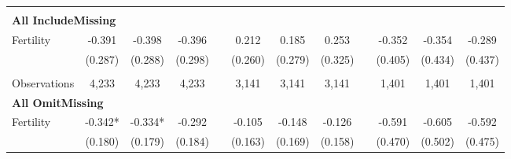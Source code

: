 \begin{landscape}
\begin{table}[htpb!]
\begin{center}
\begin{tabular}{lcccp{2mm}cccp{2mm}ccc}
\begin{footnotesize}\end{footnotesize}\\ 
\multicolumn{12}{l}{\textbf{All IncludeMissing}}\\ 
Fertility&-0.391&-0.398&-0.396&&0.212&0.185&0.253&&-0.352&-0.354&-0.289\\
&(0.287)&(0.288)&(0.298)&&(0.260)&(0.279)&(0.325)&&(0.405)&(0.434)&(0.437)\\
\begin{footnotesize}\end{footnotesize}&\begin{footnotesize}\end{footnotesize}&\begin{footnotesize}\end{footnotesize}&\begin{footnotesize}\end{footnotesize}&\begin{footnotesize}\end{footnotesize}&\begin{footnotesize}\end{footnotesize}&\begin{footnotesize}\end{footnotesize}&\begin{footnotesize}\end{footnotesize}&\begin{footnotesize}\end{footnotesize}&\begin{footnotesize}\end{footnotesize}&\begin{footnotesize}\end{footnotesize}&\begin{footnotesize}\end{footnotesize}\\Observations&4,233&4,233&4,233&&3,141&3,141&3,141&&1,401&1,401&1,401\\
\multicolumn{12}{l}{\textbf{All OmitMissing}}\\ 
Fertility&-0.342*&-0.334*&-0.292&&-0.105&-0.148&-0.126&&-0.591&-0.605&-0.592\\
&(0.180)&(0.179)&(0.184)&&(0.163)&(0.169)&(0.158)&&(0.470)&(0.502)&(0.475)\\

\end{tabular}
\end{center}
\end{table}
\end{landscape}
